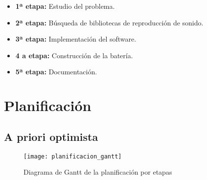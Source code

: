         \begin{itemize}
            \item \textbf{1ª etapa:} Estudio del problema.

            \item \textbf{2ª etapa:} Búsqueda de bibliotecas de reproducción de sonido.

            \item \textbf{3ª etapa:} Implementación del software.

            \item \textbf{4 a etapa:} Construcción de la batería.

            \item \textbf{5ª etapa:} Documentación.
        \end{itemize}


    \section{Planificación} %
    \label{sec:Planificacion}

        \subsection{A priori optimista} %
        \label{sub:APrioriOptimista}

            \begin{figure}[ht]
                \centering
                \texttt{[image: planificacion\_gantt]}
                \caption{Diagrama de Gantt de la planificación por etapas\label{fig:PlanificacionGantt}}
            \end{figure}






\newpage